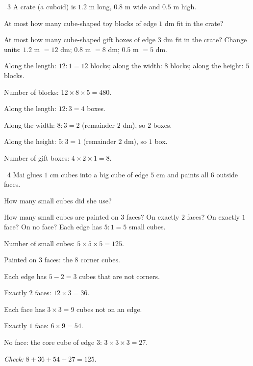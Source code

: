 \gap
\begin{exbox}{\ExWord\ 3}
A crate (a cuboid) is $1.2$ m long, $0.8$ m wide and $0.5$ m high.\par
{} At most how many cube-shaped toy blocks of edge $1$ dm fit in the crate?\par
{} At most how many cube-shaped gift boxes of edge $3$ dm fit in the crate?
\guide
Change units: $1.2$ m $=12$ dm; $0.8$ m $=8$ dm; $0.5$ m $=5$ dm.\par
{} Along the length: $12:1=12$ blocks; along the width: $8$ blocks; along the height: $5$ blocks.\par
Number of blocks: $12\times8\times5=480$.\par
{} Along the length: $12:3=4$ boxes.\par
Along the width: $8:3=2$ (remainder $2$ dm), so $2$ boxes.\par
Along the height: $5:3=1$ (remainder $2$ dm), so $1$ box.\par
Number of gift boxes: $4\times2\times1=8$.
\end{exbox}
\gap
\begin{exbox}{\ExWord\ 4}
Mai glues $1$ cm cubes into a big cube of edge $5$ cm and paints all $6$ outside faces.\par
{} How many small cubes did she use?\par
{} How many small cubes are painted on $3$ faces? On exactly $2$ faces? On exactly $1$ face? On no face?
\guide
{} Each edge has $5:1=5$ small cubes.\par Number of small cubes: $5\times5\times5=125$.\par
{} Painted on $3$ faces: the $8$ corner cubes.\par
Each edge has $5-2=3$ cubes that are not corners.\par
Exactly $2$ faces: $12\times3=36$.\par
Each face has $3\times3=9$ cubes not on an edge.\par
Exactly $1$ face: $6\times9=54$.\par
No face: the core cube of edge $3$: $3\times3\times3=27$.\par
\emph{Check:} $8+36+54+27=125$.
\end{exbox}
\gap
